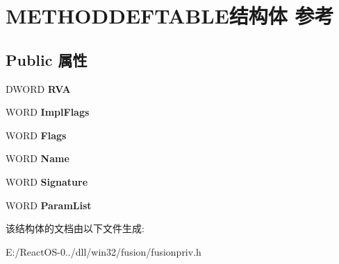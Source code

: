 \hypertarget{struct_m_e_t_h_o_d_d_e_f_t_a_b_l_e}{}\section{M\+E\+T\+H\+O\+D\+D\+E\+F\+T\+A\+B\+L\+E结构体 参考}
\label{struct_m_e_t_h_o_d_d_e_f_t_a_b_l_e}
\subsection*{Public 属性}
\begin{DoxyCompactItemize}
\item 
\mbox{\label{struct_m_e_t_h_o_d_d_e_f_t_a_b_l_e_a7c4d8c7b453d8cf13f36cd1749fac443}} 
D\+W\+O\+RD {\bfseries R\+VA}
\item 
\mbox{\label{struct_m_e_t_h_o_d_d_e_f_t_a_b_l_e_a86be1ef693fbdf5bf3e1345c96d0017e}} 
W\+O\+RD {\bfseries Impl\+Flags}
\item 
\mbox{\label{struct_m_e_t_h_o_d_d_e_f_t_a_b_l_e_abc04bad884338321558dc25a1230a3b5}} 
W\+O\+RD {\bfseries Flags}
\item 
\mbox{\label{struct_m_e_t_h_o_d_d_e_f_t_a_b_l_e_af45577db7305602beb5ab4bdffb30b65}} 
W\+O\+RD {\bfseries Name}
\item 
\mbox{\label{struct_m_e_t_h_o_d_d_e_f_t_a_b_l_e_ac39d592032cfa75282d89aabc1d60cae}} 
W\+O\+RD {\bfseries Signature}
\item 
\mbox{\label{struct_m_e_t_h_o_d_d_e_f_t_a_b_l_e_a9587441ec88a4174554257d10e512445}} 
W\+O\+RD {\bfseries Param\+List}
\end{DoxyCompactItemize}


该结构体的文档由以下文件生成\+:\begin{DoxyCompactItemize}
\item 
E\+:/\+React\+O\+S-\/0../dll/win32/fusion/fusionpriv.\+h\end{DoxyCompactItemize}
